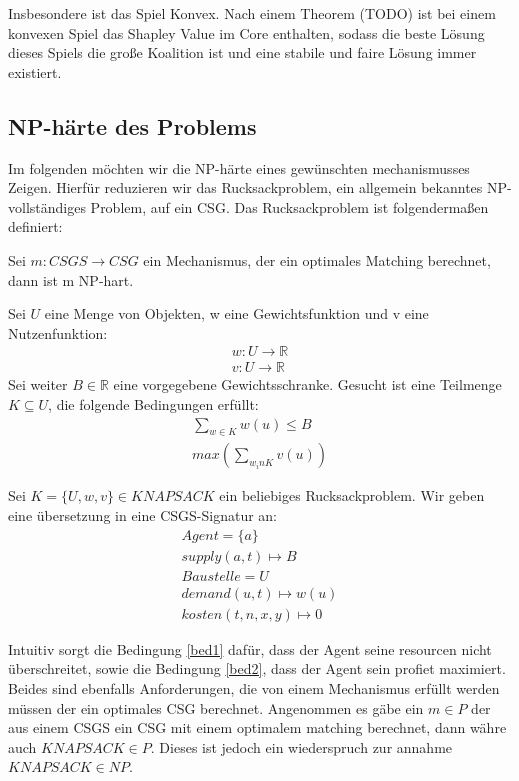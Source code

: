 \documentclass[sigconf]{acmart}
\theoremstyle{break}
\begin{document}
\noindent
Insbesondere ist das Spiel Konvex.
Nach einem Theorem (TODO) ist bei einem konvexen Spiel das Shapley Value im Core enthalten, sodass die beste Lösung dieses Spiels die große Koalition ist und eine stabile und faire Lösung immer existiert.

\subsection{NP-härte des Problems}
Im folgenden möchten wir die NP-härte eines gewünschten mechanismusses Zeigen. Hierfür reduzieren wir das Rucksackproblem, ein allgemein bekanntes NP-vollständiges Problem, auf ein CSG.
Das Rucksackproblem ist folgendermaßen definiert:

\begin{lemma}
Sei $m:CSGS\rightarrow CSG$ ein Mechanismus, der ein optimales Matching berechnet, dann ist m NP-hart.
\end{lemma}

\begin{definition}[Rucksackproblem]
Sei $U$ eine Menge von Objekten, w eine Gewichtsfunktion und v eine Nutzenfunktion:
\begin{align}
  w: U\rightarrow \mathbb{R} \\
  v: U\rightarrow \mathbb{R}
\end{align}
Sei weiter $B\in\mathbb{R}$ eine vorgegebene Gewichtsschranke.
Gesucht ist eine Teilmenge $K\subseteq U$, die folgende Bedingungen erfüllt:
\begin{align}
  \sum_{w\in K}w(u)\leq B \label{bed1}\\
  max(\sum_{w_in K}v(u)) \label{bed2}
\end{align}
\end{definition}

Sei $K=\{U,w,v\}\in KNAPSACK$ ein beliebiges Rucksackproblem. Wir geben eine übersetzung in eine CSGS-Signatur an:
\begin{align}
  Agent = \{a\} \\
  supply(a, t) \mapsto B \\
  Baustelle = U \\
  demand(u, t) \mapsto w(u) \\
  kosten(t, n, x, y) \mapsto 0
\end{align}

Intuitiv sorgt die Bedingung \ref{bed1} dafür, dass der Agent seine resourcen nicht überschreitet, sowie die Bedingung \ref{bed2}, dass der Agent sein profiet maximiert. Beides sind ebenfalls Anforderungen, die von einem Mechanismus erfüllt werden müssen der ein optimales CSG berechnet.
Angenommen es gäbe ein $m\in P$ der aus einem CSGS ein CSG mit einem optimalem matching berechnet, dann währe auch $KNAPSACK\in P$. Dieses ist jedoch ein wiederspruch zur annahme $KNAPSACK\in NP$.
\end{document}
